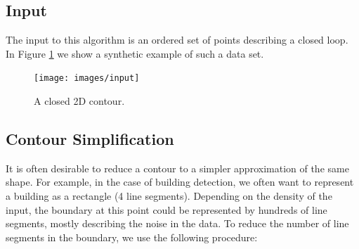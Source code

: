 \documentclass{InsightArticle}
\begin{document}
\subsection{Input}
\label{sec:Algorithm:Input}
The input to this algorithm is an ordered set of points describing a closed loop. In Figure \ref{fig:Input} we show a synthetic example of such a data set.

\begin{figure}[H]
  \centering
  \texttt{[image: images/input]}
  \caption{A closed 2D contour.}
  \label{fig:Input}
\end{figure}

\subsection{Contour Simplification}
\label{sec:Algorithm:ContourSimplification}
It is often desirable to reduce a contour to a simpler approximation of the same shape. For example, in the case of building detection, we often want to represent a building as a rectangle (4 line segments). Depending on the density of the input, the boundary at this point could be represented by hundreds of line segments, mostly describing the noise in the data. To reduce the number of line segments in the boundary, we use the following procedure:
\end{document}
